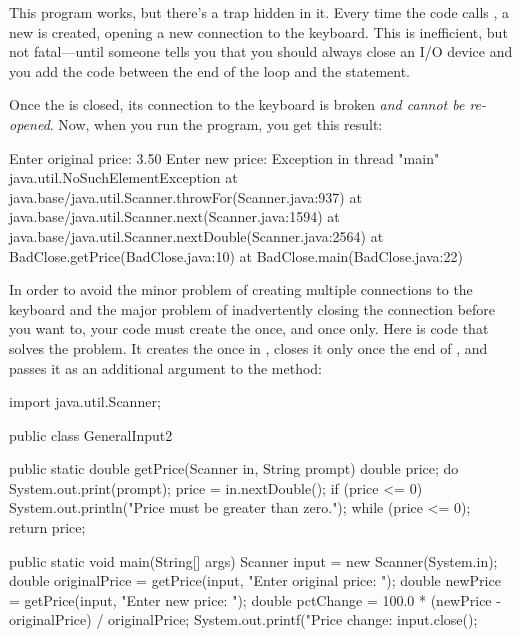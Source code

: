 This program works, but there's a trap hidden in it. Every time the code calls , a new  is created, opening a new connection to the keyboard. This is inefficient, but not fatal---until someone tells you that you should always close an I/O device and you add the code  between the end of the loop and the  statement.

Once the  is closed, its connection to the keyboard is broken {\em and cannot be re-opened}. Now, when you run the program, you get this result:

\begin{stdout}
Enter original price: 3.50
Enter new price: Exception in thread "main"
  java.util.NoSuchElementException
        at java.base/java.util.Scanner.throwFor(Scanner.java:937)
        at java.base/java.util.Scanner.next(Scanner.java:1594)
        at java.base/java.util.Scanner.nextDouble(Scanner.java:2564)
        at BadClose.getPrice(BadClose.java:10)
        at BadClose.main(BadClose.java:22)
\end{stdout}

In order to avoid the minor problem of creating multiple connections to the keyboard and the major problem of inadvertently closing the connection before you want to, your code must create the  once, and once only. Here is code that solves the problem. It creates the  once in , closes it only once the end of , and passes it as an additional argument to the  method:

\begin{code}
import java.util.Scanner;

public class GeneralInput2 {
  
  public static double getPrice(Scanner in, String prompt) {
    double price;
    do {
      System.out.print(prompt);
      price = in.nextDouble();
      if (price <= 0) {
        System.out.println("Price must be greater than zero.");
      }
    } while (price <= 0);
    return price;
  }

    
  public static void main(String[] args) {
    Scanner input = new Scanner(System.in);
    double originalPrice = getPrice(input, "Enter original price: ");
    double newPrice = getPrice(input, "Enter new price: ");
    double pctChange = 100.0 *
      (newPrice - originalPrice) / originalPrice;
    System.out.printf("Price change: %
    input.close();
  }
}
\end{code}

